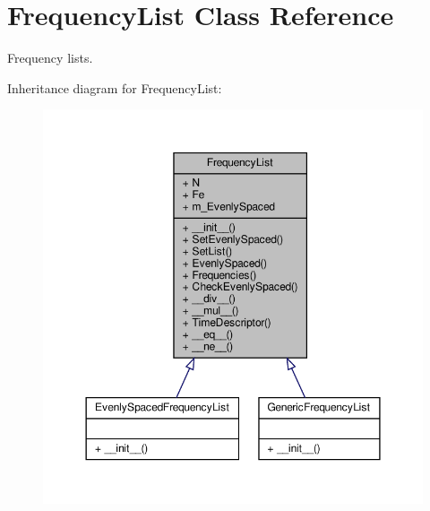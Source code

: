 \hypertarget{classSignalIntegrity_1_1FrequencyDomain_1_1FrequencyList_1_1FrequencyList}{}\section{Frequency\+List Class Reference}
\label{classSignalIntegrity_1_1FrequencyDomain_1_1FrequencyList_1_1FrequencyList}


Frequency lists.  




Inheritance diagram for Frequency\+List\+:\nopagebreak
\begin{figure}[H]
\begin{center}
\leavevmode
\includegraphics[width=350pt]{classSignalIntegrity_1_1FrequencyDomain_1_1FrequencyList_1_1FrequencyList__inherit__graph}
\end{center}
\end{figure}



